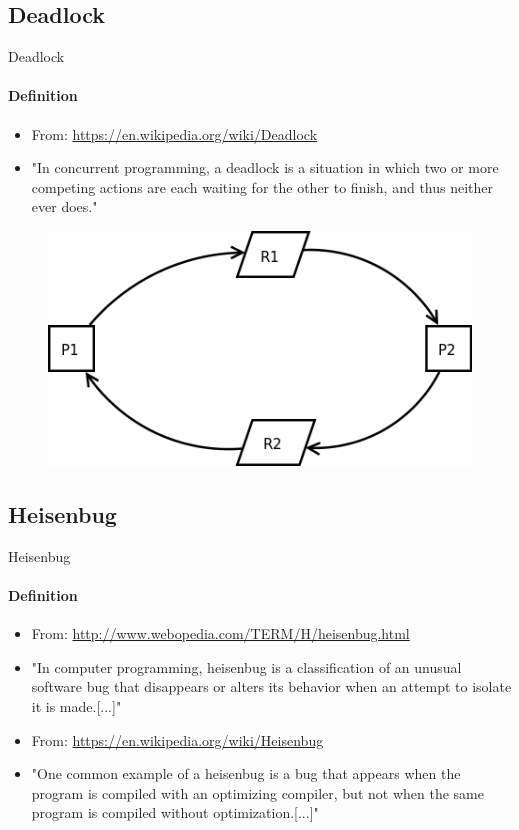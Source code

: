 \documentclass[9pt,pdftex]{beamer}
\begin{document}
\subsection{Deadlock}
\begin{frame}{Deadlock}
\framesubtitle{Definition}
\begin{itemize}
\item From: \url{https://en.wikipedia.org/wiki/Deadlock}
\item[] "In concurrent programming, a deadlock is a situation in which two or more competing actions are each waiting for the other to finish, and thus neither ever does."
\end{itemize}
\begin{figure}
\centering
\includegraphics[scale=0.35]{img/Deadlock.png}
\end{figure}
\end{frame}

\subsection{Heisenbug}
\begin{frame}{Heisenbug}
\framesubtitle{Definition}
\begin{itemize}
\item From: \url{http://www.webopedia.com/TERM/H/heisenbug.html}
\item[] "In computer programming, heisenbug is a classification of an unusual software bug that disappears or alters its behavior when an attempt to isolate it is made.[...]"
\item From: \url{https://en.wikipedia.org/wiki/Heisenbug}
\item[] "One common example of a heisenbug is a bug that appears when the program is compiled with an optimizing compiler, but not when the same program is compiled without optimization.[...]"
\end{itemize}
\end{frame}
\end{document}
